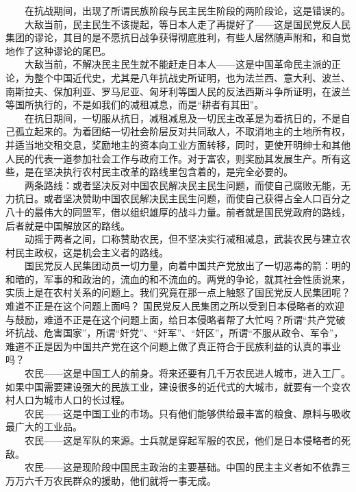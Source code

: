 \documentclass[cn,11pt,chinese]{elegantbook}
\begin{document}
　　在抗战期间，出现了所谓民族阶段与民主民生阶段的两阶段论，这是错误的。\\
　　大敌当前，民主民生不该提起，等日本人走了再提好了——这是国民党反人民集团的谬论，其目的是不愿抗日战争获得彻底胜利，有些人居然随声附和，和自觉地作了这种谬论的尾巴。\\
　　大敌当前，不解决民主民生就不能赶走日本人——这是中国革命民主派的正论，为整个中国近代史，尤其是八年抗战史所证明，也为法兰西、意大利、波兰、南斯拉夫、保加利亚、罗马尼亚、匈牙利等国人民的反法西斯斗争所证明，在波兰等国所执行的，不是如我们的减租减息，而是“耕者有其田”。\\
　　在抗日期间，一切服从抗日，减租减息及一切民主改革是为着抗日的，不是自己孤立起来的。为着团结一切社会阶层反对共同敌人，不取消地主的土地所有权，并适当地交租交息，奖励地主的资本向工业方面转移，同时，更使开明绅士和其他人民的代表一道参加社会工作与政府工作。对于富农，则奖励其发展生产。所有这些，是在坚决执行农村民主改革的路线里包含着的，是完全必要的。\\
　　两条路线：或者坚决反对中国农民解决民主民生问题，而使自己腐败无能，无力抗日。或者坚决赞助中国农民解决民主民生问题，而使自己获得占全人口百分之八十的最伟大的同盟军，借以组织雄厚的战斗力量。前者就是国民党政府的路线，后者就是中国解放区的路线。\\
　　动摇于两者之间，口称赞助农民，但不坚决实行减租减息，武装农民与建立农村民主政权，这是机会主义者的路线。\\
　　国民党反人民集团动员一切力量，向着中国共产党放出了一切恶毒的箭：明的和暗的，军事的和政治的，流血的和不流血的。两党的争论，就其社会性质说来，实质上是在农村关系的问题上。我们究竟在那一点上触怒了国民党反人民集团呢？难道不正是在这个问题上面吗？ 国民党反人民集团之所以受到日本侵略者的欢迎与鼓励，难道不正是在这个问题上面，给日本侵略者帮了大忙吗？所谓“共产党破坏抗战、危害国家”，所谓“奸党”、“奸军”、“奸区”，所谓“不服从政令、军令”，难道不正是因为中国共产党在这个问题上做了真正符合于民族利益的认真的事业吗？\\
　　农民——这是中国工人的前身。将来还要有几千万农民进人城市，进入工厂。如果中国需要建设强大的民族工业，建设很多的近代式的大城市，就要有一个变农村人口为城市人口的长过程。\\
　　农民——这是中国工业的市场。只有他们能够供给最丰富的粮食、原料与吸收最广大的工业品。\\
　　农民——这是军队的来源。士兵就是穿起军服的农民，他们是日本侵略者的死敌。\\
　　农民——这是现阶段中国民主政治的主要基础。中国的民主主义者如不依靠三万万六千万农民群众的援助，他们就将一事无成。\\
\end{document}
